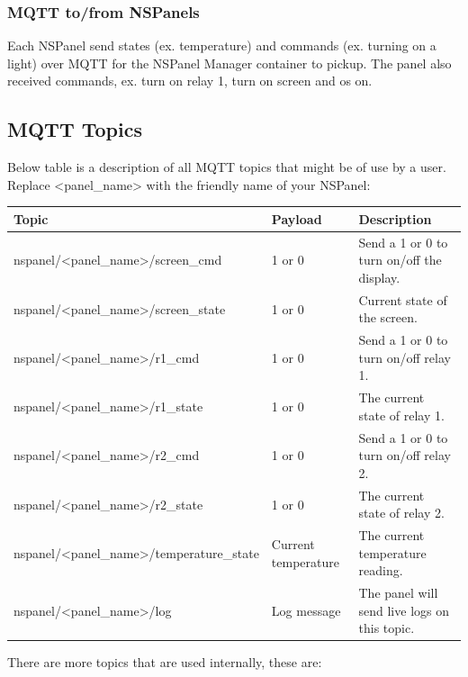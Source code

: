\documentclass[10pt]{article}
\begin{document}
    \subsubsection{MQTT to/from NSPanels}
    Each NSPanel send states (ex. temperature) and commands (ex. turning on a light) over MQTT for the NSPanel Manager container to pickup. The panel also received commands, ex. turn on relay 1, turn on screen and os on.

    \subsection{MQTT Topics}
    Below table is a description of all MQTT topics that might be of use by a user. Replace <panel\_name> with the friendly name of your NSPanel:
    \begin{table}[H]
    \begin{tabular}{|l|l|l|}
    \hline
    \textbf{Topic} & \textbf{Payload}  & \textbf{Description}  \\ \hline
    nspanel/<panel\_name>/screen\_cmd & 1 or 0 & Send a 1 or 0 to turn on/off the display. \\ \hline
    nspanel/<panel\_name>/screen\_state & 1 or 0 & Current state of the screen. \\ \hline
    nspanel/<panel\_name>/r1\_cmd & 1 or 0 & Send a 1 or 0 to turn on/off relay 1. \\ \hline
    nspanel/<panel\_name>/r1\_state & 1 or 0 & The current state of relay 1. \\ \hline
    nspanel/<panel\_name>/r2\_cmd & 1 or 0 & Send a 1 or 0 to turn on/off relay 2. \\ \hline
    nspanel/<panel\_name>/r2\_state & 1 or 0 & The current state of relay 2. \\ \hline
    nspanel/<panel\_name>/temperature\_state & Current temperature & The current temperature reading. \\ \hline
    nspanel/<panel\_name>/log & Log message & The panel will send live logs on this topic. \\ \hline
    \end{tabular}
    \end{table}

    There are more topics that are used internally, these are:
\end{document}
